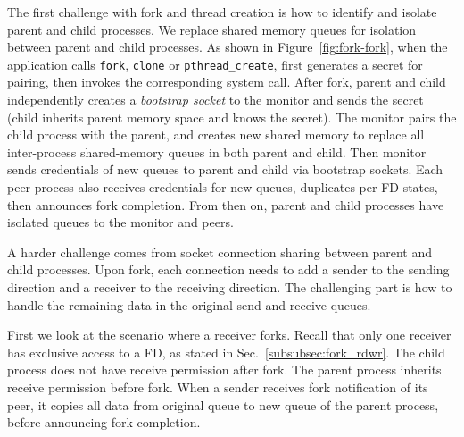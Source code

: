 The first challenge with fork and thread creation is how to identify and isolate parent and child processes. We replace shared memory queues for isolation between parent and child processes. As shown in Figure~\ref{fig:fork-fork}, when the application calls \texttt{fork}, \texttt{clone} or \texttt{pthread\_create}, \libipc{} first generates a secret for pairing, then invokes the corresponding system call. After fork, parent and child independently creates a \textit{bootstrap socket} to the monitor and sends the secret (child inherits parent memory space and knows the secret). The monitor pairs the child process with the parent, and creates new shared memory to replace all inter-process shared-memory queues in both parent and child. Then monitor sends credentials of new queues to parent and child via bootstrap sockets. Each peer process also receives credentials for new queues, duplicates per-FD states, then announces fork completion. From then on, parent and child processes have isolated queues to the monitor and peers.

A harder challenge comes from socket connection sharing between parent and child processes. Upon fork, each connection needs to add a sender to the sending direction and a receiver to the receiving direction. The challenging part is how to handle the remaining data in the original send and receive queues.



First we look at the scenario where a receiver forks. Recall that only one receiver has exclusive access to a FD, as stated in Sec.~\ref{subsubsec:fork_rdwr}. The child process does not have receive permission after fork. The parent process inherits receive permission before fork. When a sender receives fork notification of its peer, it copies all data from original queue to new queue of the parent process, before announcing fork completion.

